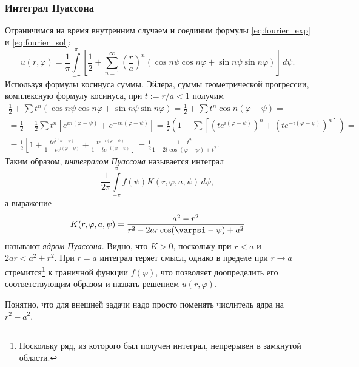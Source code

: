 \subsubsection{Интеграл Пуассона}
Ограничимся на время внутренним случаем и соединим формулы
\eqref{eq:fourier_exp} и \eqref{eq:fourier_sol}:
\[
  u(r,\varphi) = \frac{1}{\pi} \int\limits_{-\pi}^{\pi} \left[ \frac{1}{2} + \sum_{n=1}^\infty \left(
  \frac{r}{a} \right)^n (\cos n\psi\cos n\varphi + \sin n\psi \sin n\varphi
)\right] \, d\psi.
\]
Используя формулы косинуса суммы, Эйлера, суммы геометрической прогрессии,
комплексную формулу косинуса, при
$ t := r/a < 1 $ получим
\begin{multline*}
    \frac{1}{2} + \sum t^n(\cos n\psi \cos n\varphi + \sin n\psi \sin n\varphi)
    = \frac{1}{2} + \sum t^n \cos n(\varphi - \psi) =\\=
    \frac{1}{2} + \frac{1}{2}\sum t^n \left[ e^{in(\varphi-\psi)} +
    e^{-in(\varphi - \psi)} \right] = \frac{1}{2} \left( 1 + \sum \left[
(te^{i(\varphi - \psi)})^n + (te^{-i(\varphi - \psi)})^n \right]  \right) =\\=
  \frac{1}{2} \left[ 1 + \frac{te^{i(\varphi - \psi)}}{1 - te^{i(\varphi-\psi)}}
    + \frac{te^{-i(\varphi - \psi)}}{1 - te^{-i(\varphi-\psi)}}\right] =
    \frac{1}{2} \frac{1 - t^2}{1 - 2t\cos(\varphi - \psi) + t^2}.
\end{multline*}
Таким образом, \emph{интегралом Пуассона} называется интеграл 
\[
    \frac{1}{2\pi} \int\limits_{-\pi}^{\pi}f(\psi) K(r, \varphi, a,
    \psi)\,d\psi,
\]
а выражение  
\[
    K(r,\varphi, a,\psi) = \frac{a^2 - r^2}{r^2 - 2ar\cos(\varpsi-\psi) + a^2}
\]
называют \emph{ядром Пуассона}. Видно, что $ K > 0 $, поскольку при $ r < a $ и
$ 2ar < a^2 + r^2 $. При $ r = a $ интеграл теряет смысл, однако в пределе при
$ r \to a $ стремится\footnote{Поскольку ряд, из
которого был получен интеграл, непрерывен в замкнутой области.} к граничной функции $ f(\varphi) $, что позволяет
доопределить его соответствующим образом и назвать решением $
u(r,\varphi) $.

Понятно, что для внешней задачи надо просто
поменять числитель ядра на $ r^2 - a^2 $.


